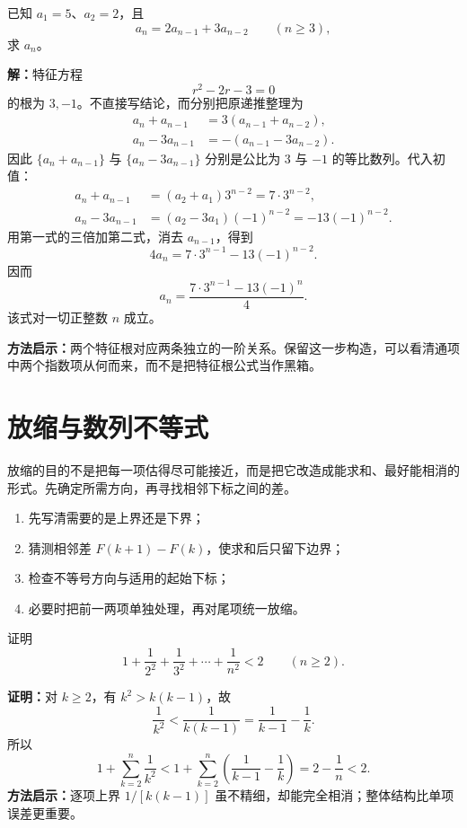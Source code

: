 \begin{examplebox}
  已知 $a_1=5$、$a_2=2$，且
  \[
    a_n=2a_{n-1}+3a_{n-2}\qquad(n\ge3),
  \]
  求 $a_n$。

  \textbf{解：}特征方程
  \[
    r^2-2r-3=0
  \]
  的根为 $3,-1$。不直接写结论，而分别把原递推整理为
  \begin{align*}
    a_n+a_{n-1}&=3(a_{n-1}+a_{n-2}),\\
    a_n-3a_{n-1}&=-(a_{n-1}-3a_{n-2}).
  \end{align*}
  因此 $\{a_n+a_{n-1}\}$ 与 $\{a_n-3a_{n-1}\}$ 分别是公比为 $3$ 与 $-1$ 的等比数列。代入初值：
  \begin{align*}
    a_n+a_{n-1}&=(a_2+a_1)3^{n-2}=7\cdot3^{n-2},\\
    a_n-3a_{n-1}&=(a_2-3a_1)(-1)^{n-2}
      =-13(-1)^{n-2}.
  \end{align*}
  用第一式的三倍加第二式，消去 $a_{n-1}$，得到
  \[
    4a_n=7\cdot3^{n-1}-13(-1)^{n-2}.
  \]
  因而
  \[
    \boxed{a_n=\frac{7\cdot3^{n-1}-13(-1)^n}4}.
  \]
  该式对一切正整数 $n$ 成立。

  \textbf{方法启示：}两个特征根对应两条独立的一阶关系。保留这一步构造，可以看清通项中两个指数项从何而来，而不是把特征根公式当作黑箱。
\end{examplebox}

\section{放缩与数列不等式}

放缩的目的不是把每一项估得尽可能接近，而是把它改造成能求和、最好能相消的形式。先确定所需方向，再寻找相邻下标之间的差。

\begin{corollarybox}[设计可相消放缩的步骤]
  \begin{enumerate}
    \item 先写清需要的是上界还是下界；
    \item 猜测相邻差 $F(k+1)-F(k)$，使求和后只留下边界；
    \item 检查不等号方向与适用的起始下标；
    \item 必要时把前一两项单独处理，再对尾项统一放缩。
  \end{enumerate}
\end{corollarybox}

\begin{examplebox}
  证明
  \[
    1+\frac1{2^2}+\frac1{3^2}+\cdots+\frac1{n^2}<2
    \qquad(n\ge2).
  \]

  \textbf{证明：}对 $k\ge2$，有 $k^2>k(k-1)$，故
  \[
    \frac1{k^2}<\frac1{k(k-1)}=\frac1{k-1}-\frac1k.
  \]
  所以
  \[
    1+\sum_{k=2}^{n}\frac1{k^2}
    <1+\sum_{k=2}^{n}\left(\frac1{k-1}-\frac1k\right)
    =2-\frac1n<2.
  \]
  \textbf{方法启示：}逐项上界 $1/[k(k-1)]$ 虽不精细，却能完全相消；整体结构比单项误差更重要。
\end{examplebox}


